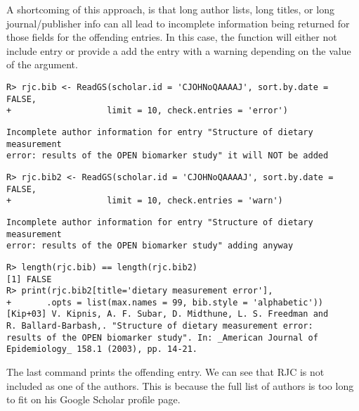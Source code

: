 \documentclass[article]{jss}\usepackage[]{graphicx}\usepackage[]{color}
\makeatletter
\newenvironment{kframe}{%
 \def\at@end@of@kframe{}%
 \ifinner\ifhmode%
  \def\at@end@of@kframe{\end{minipage}}%
  \begin{minipage}{\columnwidth}%
 \fi\fi%
 \def\FrameCommand##1{\hskip\@totalleftmargin \hskip-\fboxsep
 \colorbox{shadecolor}{##1}\hskip-\fboxsep
     \hskip-\linewidth \hskip-\@totalleftmargin \hskip\columnwidth}%
 \MakeFramed {\advance\hsize-\width
   \@totalleftmargin\z@ \linewidth\hsize
   \@setminipage}}%
 {\par\unskip\endMakeFramed%
 \at@end@of@kframe}
\newenvironment{knitrout}{}{} %
\makeatother
\begin{document}
A shortcoming of this approach, is that long author lists, long titles, or long journal/publisher info can all lead to incomplete information being returned for those fields for the offending entries.  In this case, the  function will either not include entry or provide a add the entry with a warning depending on the value of the  argument.
\begin{knitrout}
\color{fgcolor}\begin{kframe}
\begin{verbatim}
R> rjc.bib <- ReadGS(scholar.id = 'CJOHNoQAAAAJ', sort.by.date = FALSE, 
+                   limit = 10, check.entries = 'error')
\end{verbatim}
\begin{lstlisting}[style=output]
Incomplete author information for entry "Structure of dietary measurement 
error: results of the OPEN biomarker study" it will NOT be added
\end{lstlisting}\begin{verbatim}
R> rjc.bib2 <- ReadGS(scholar.id = 'CJOHNoQAAAAJ', sort.by.date = FALSE, 
+                   limit = 10, check.entries = 'warn')
\end{verbatim}
\begin{lstlisting}[style=output]
Incomplete author information for entry "Structure of dietary measurement 
error: results of the OPEN biomarker study" adding anyway
\end{lstlisting}\begin{verbatim}
R> length(rjc.bib) == length(rjc.bib2)
[1] FALSE
R> print(rjc.bib2[title='dietary measurement error'], 
+       .opts = list(max.names = 99, bib.style = 'alphabetic'))
[Kip+03] V. Kipnis, A. F. Subar, D. Midthune, L. S. Freedman and
R. Ballard-Barbash,. "Structure of dietary measurement error:
results of the OPEN biomarker study". In: _American Journal of
Epidemiology_ 158.1 (2003), pp. 14-21.
\end{verbatim}
\end{kframe}
\end{knitrout}

The last command prints the offending entry.  We can see that RJC is not included as one of the authors.  This is because the full list of authors is too long to fit on his Google Scholar profile page.
\end{document}
